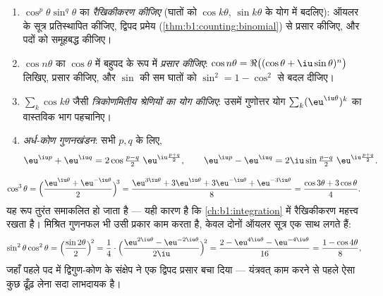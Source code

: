 \begin{method}[चरघातांकी के द्वारा त्रिकोणमिति]\label{met:b1:complex:trig}
\begin{enumerate}
  \item $\cos^p\theta \sin^q\theta$ का \emph{रैखिकीकरण कीजिए} (घातों को
  $\cos k\theta$, $\sin k\theta$ के योग में बदलिए): ऑयलर के सूत्र
  प्रतिस्थापित कीजिए, द्विपद प्रमेय (\cref{thm:b1:counting:binomial}) से
  प्रसार कीजिए, और  पदों को समूहबद्ध कीजिए।
  \item $\cos n\theta$ का $\cos\theta$ में बहुपद के रूप में \emph{प्रसार
  कीजिए}: $\cos n\theta = \Re\bigl((\cos\theta + \iu\sin\theta)^n\bigr)$
  लिखिए, प्रसार कीजिए, और $\sin$ की सम घातों को $\sin^2 = 1 - \cos^2$ से बदल
  दीजिए।
  \item $\sum_k \cos k\theta$ जैसी \emph{त्रिकोणमितीय श्रेणियों का योग
  कीजिए}: उसमें गुणोत्तर योग $\sum_k (\eu^{\iu\theta})^k$ का वास्तविक भाग
  पहचानिए।
  \item \emph{अर्ध-कोण गुणनखंडन}: सभी $p, q$ के लिए,
        \[
        \eu^{\iu p} + \eu^{\iu q}
        = 2 \cos\tfrac{p - q}{2}\; \eu^{\iu \frac{p+q}{2}},
        \qquad
        \eu^{\iu p} - \eu^{\iu q}
        = 2\iu \sin\tfrac{p - q}{2}\; \eu^{\iu \frac{p+q}{2}} .
        \]
\end{enumerate}
\end{method}

\begin{example}[रैखिकीकरण]\label{ex:b1:complex:linearize}
\[
\cos^3\theta
= \Bigl(\frac{\eu^{\iu\theta} + \eu^{-\iu\theta}}{2}\Bigr)^{\!3}
= \frac{\eu^{3\iu\theta} + 3\eu^{\iu\theta} + 3\eu^{-\iu\theta} +
\eu^{-3\iu\theta}}{8}
= \frac{\cos 3\theta + 3\cos\theta}{4}.
\]
यह रूप तुरंत समाकलित हो जाता है --- यही कारण है कि \cref{ch:b1:integration}
में रैखिकीकरण महत्त्व रखता है। मिश्रित गुणनफल भी उसी प्रकार काम करता है,
केवल दोनों ऑयलर सूत्र एक साथ लगते हैं:
\[
\sin^2\theta\cos^2\theta
= \Bigl(\frac{\sin2\theta}2\Bigr)^{\!2}
= \frac{1}{4}\cdot
\Bigl(\frac{\eu^{2\iu\theta} - \eu^{-2\iu\theta}}{2\iu}
\Bigr)^{\!2}
= \frac{2 - \eu^{4\iu\theta} - \eu^{-4\iu\theta}}{16}
= \frac{1 - \cos4\theta}{8} ,
\]
जहाँ पहले पद में द्विगुण-कोण के संक्षेप ने एक द्विपद प्रसार बचा दिया ---
यंत्रवत् काम करने से पहले ऐसा कुछ ढूँढ़ लेना सदा लाभदायक है।
\end{example}

